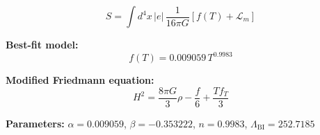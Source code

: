 
\begin{equation}
  S = \int d^4x \, |e| \, \frac{1}{16\pi G} \left[ f(T) + \mathcal{L}_m \right]
\end{equation}

\textbf{Best-fit model:}
\begin{equation}
  f(T) = 0.009059 \, T^{0.9983}
\end{equation}

\textbf{Modified Friedmann equation:}
\begin{equation}
  H^2 = \frac{8\pi G}{3} \rho - \frac{f}{6} + \frac{T f_T}{3}
\end{equation}

\textbf{Parameters:}
$\alpha = 0.009059$, \quad
$\beta = -0.353222$, \quad
$n = 0.9983$, \quad
$\Lambda_{\text{BI}} = 252.7185$